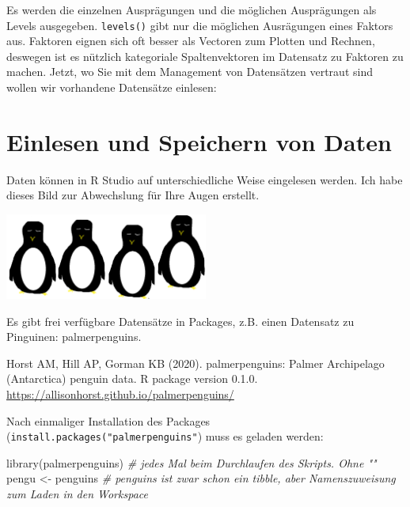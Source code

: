 \documentclass[
]{book}
\newenvironment{Shaded}{\begin{snugshade}}{\end{snugshade}}
\newcommand{\CommentTok}[1]{\textcolor[rgb]{0.56,0.35,0.01}{\textit{#1}}}
\newcommand{\FunctionTok}[1]{\textcolor[rgb]{0.00,0.00,0.00}{#1}}
\newcommand{\NormalTok}[1]{#1}
\newcommand{\OtherTok}[1]{\textcolor[rgb]{0.56,0.35,0.01}{#1}}
\theoremstyle{definition}
\theoremstyle{definition}
\theoremstyle{definition}
\theoremstyle{definition}
\theoremstyle{remark}
\begin{document}
Es werden die einzelnen Ausprägungen und die möglichen Ausprägungen als Levels ausgegeben. \texttt{levels()} gibt nur die möglichen Ausrägungen eines Faktors aus. Faktoren eignen sich oft besser als Vectoren zum Plotten und Rechnen, deswegen ist es nützlich kategoriale Spaltenvektoren im Datensatz zu Faktoren zu machen. Jetzt, wo Sie mit dem Management von Datensätzen vertraut sind wollen wir vorhandene Datensätze einlesen:

\hypertarget{einlesen-und-speichern-von-daten}{%
\section{Einlesen und Speichern von Daten}\label{einlesen-und-speichern-von-daten}}

Daten können in R Studio auf unterschiedliche Weise eingelesen werden. Ich habe dieses Bild zur Abwechslung für Ihre Augen erstellt.

\includegraphics[width=0.5\textwidth,height=\textheight]{_bookdown_files/_main_files/figure-html/png.png}

Es gibt frei verfügbare Datensätze in Packages, z.B. einen Datensatz zu Pinguinen: palmerpenguins.

Horst AM, Hill AP, Gorman KB (2020). palmerpenguins: Palmer Archipelago (Antarctica) penguin data. R package version 0.1.0.
\url{https://allisonhorst.github.io/palmerpenguins/}

Nach einmaliger Installation des Packages (\texttt{install.packages("palmerpenguins"}) muss es geladen werden:

\begin{Shaded}
\begin{Highlighting}[]
\FunctionTok{library}\NormalTok{(palmerpenguins) }\CommentTok{\# jedes Mal beim Durchlaufen des Skripts. Ohne ""}
\NormalTok{pengu }\OtherTok{\textless{}{-}}\NormalTok{ penguins       }\CommentTok{\# penguins ist zwar schon ein tibble, aber Namenszuweisung zum Laden in den Workspace}
\end{Highlighting}
\end{Shaded}
\end{document}
